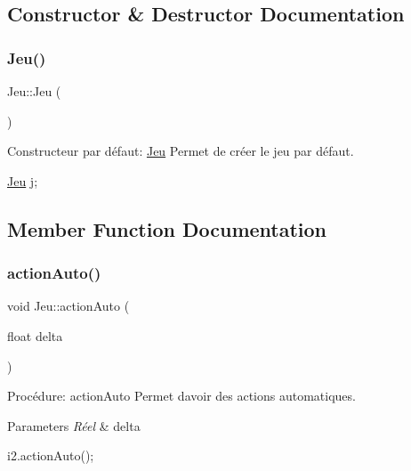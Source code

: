 \subsection{Constructor \& Destructor Documentation}
\mbox{\label{classJeu_acc5795ee00edf75516d3dfe65be3e6d6}} 
\subsubsection{\texorpdfstring{Jeu()}{Jeu()}}
{\footnotesize\ttfamily Jeu\+::\+Jeu (\begin{DoxyParamCaption}{ }\end{DoxyParamCaption})}



Constructeur par défaut\+: \hyperlink{classJeu}{Jeu} Permet de créer le jeu par défaut. 


\begin{DoxyCode}
\hyperlink{classJeu}{Jeu} j;
\end{DoxyCode}
 

\subsection{Member Function Documentation}
\mbox{\label{classJeu_a8d2a0773d8edcb42d5e055785ad4b71a}} 
\subsubsection{\texorpdfstring{action\+Auto()}{actionAuto()}}
{\footnotesize\ttfamily void Jeu\+::action\+Auto (\begin{DoxyParamCaption}\item[{float}]{delta }\end{DoxyParamCaption})}



Procédure\+: action\+Auto Permet d\textquotesingle{}avoir des actions automatiques. 


\begin{DoxyParams}{Parameters}
{\em Réel} & delta 
\begin{DoxyCode}
i2.actionAuto();
\end{DoxyCode}
 \\
\hline
\end{DoxyParams}
\mbox{\label{classJeu_a4f8c73b225819fb5a6ba342adc2f1fa4}} 
